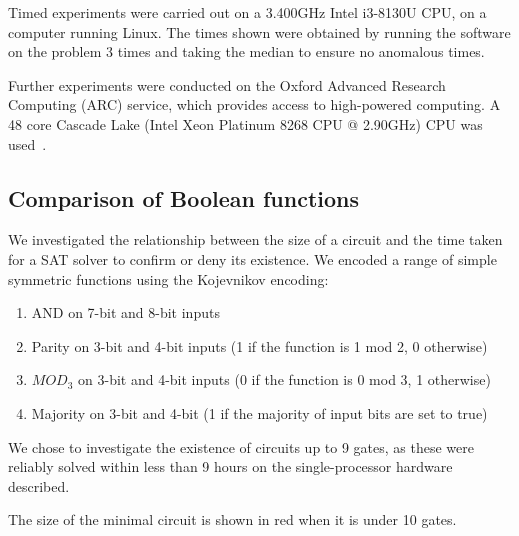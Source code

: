\documentclass{article}
\begin{document}
Timed experiments were carried out on a 3.400GHz Intel i3-8130U CPU, on a computer running Linux. The times shown were obtained by running the software on the problem 3 times and taking the median to ensure no anomalous times.

Further experiments were conducted on the Oxford Advanced Research Computing (ARC) service, which provides access to high-powered computing. A 48 core Cascade Lake (Intel Xeon Platinum 8268 CPU @ 2.90GHz) CPU was used~\cite{arc}.

\subsection{Comparison of Boolean functions}\label{funcresults}

We investigated the relationship between the size of a circuit and the time taken for a SAT solver to confirm or deny its existence. We encoded a range of simple symmetric functions using the Kojevnikov encoding:

\begin{enumerate}
  \item AND on 7-bit and 8-bit inputs
  \item Parity on 3-bit and 4-bit inputs (1 if the function is 1 mod 2, 0 otherwise)
  \item \(MOD_3\) on 3-bit and 4-bit inputs (0 if the function is 0 mod 3, 1 otherwise)
  \item Majority on 3-bit and 4-bit  (1 if the majority of input bits are set to true)
\end{enumerate}

We chose to investigate the existence of circuits up to 9 gates, as these were reliably solved within less than 9 hours on the single-processor hardware described.

The size of the minimal circuit is shown in red when it is under 10 gates. 
\end{document}
